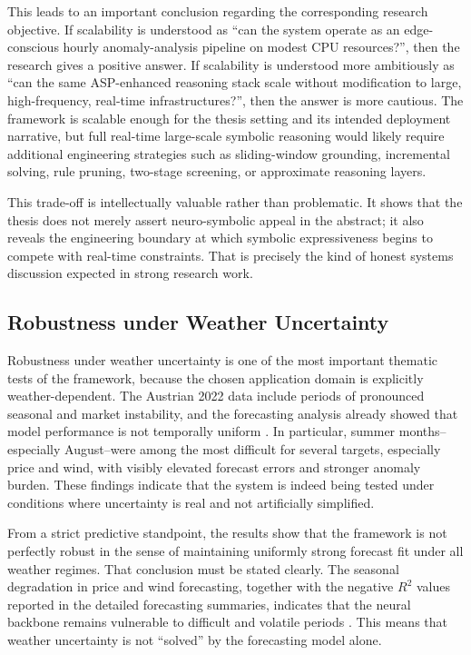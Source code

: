 This leads to an important conclusion regarding the corresponding research objective. If scalability is understood as ``can the system operate as an edge-conscious hourly anomaly-analysis pipeline on modest CPU resources?'', then the research gives a positive answer. If scalability is understood more ambitiously as ``can the same ASP-enhanced reasoning stack scale without modification to large, high-frequency, real-time infrastructures?'', then the answer is more cautious. The framework is scalable enough for the thesis setting and its intended deployment narrative, but full real-time large-scale symbolic reasoning would likely require additional engineering strategies such as sliding-window grounding, incremental solving, rule pruning, two-stage screening, or approximate reasoning layers.

This trade-off is intellectually valuable rather than problematic. It shows that the thesis does not merely assert neuro-symbolic appeal in the abstract; it also reveals the engineering boundary at which symbolic expressiveness begins to compete with real-time constraints. That is precisely the kind of honest systems discussion expected in strong research work.

\subsection{Robustness under Weather Uncertainty}
\label{subsec:discussion_weather_uncertainty}

Robustness under weather uncertainty is one of the most important thematic tests of the framework, because the chosen application domain is explicitly weather-dependent. The Austrian 2022 data include periods of pronounced seasonal and market instability, and the forecasting analysis already showed that model performance is not temporally uniform \cite{repo_thesis_grid_anomaly}. In particular, summer months--especially August--were among the most difficult for several targets, especially price and wind, with visibly elevated forecast errors and stronger anomaly burden. These findings indicate that the system is indeed being tested under conditions where uncertainty is real and not artificially simplified.

From a strict predictive standpoint, the results show that the framework is not perfectly robust in the sense of maintaining uniformly strong forecast fit under all weather regimes. That conclusion must be stated clearly. The seasonal degradation in price and wind forecasting, together with the negative $R^2$ values reported in the detailed forecasting summaries, indicates that the neural backbone remains vulnerable to difficult and volatile periods \cite{repo_thesis_grid_anomaly}. This means that weather uncertainty is not ``solved'' by the forecasting model alone.

